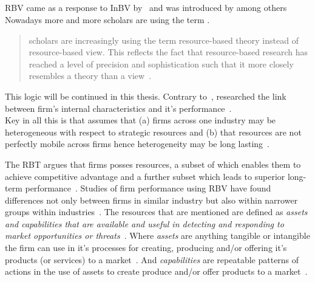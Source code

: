 \subsection{\rbt}\label{sec:Barney} %


\Gls{RBV} came as a response to \gls{InBV} by~\cite{Porter:1980to} and was introduced by among others~\cite{Barney:1991ur,Wernerfelt:1984hx}
Nowadays more and more scholars are using the term \rbt.
\begin{quote}
  scholars are increasingly using the term resource-based theory instead of
resource-based view.
This reflects the fact that resource-based research has reached a level of
precision and sophistication such that it more closely resembles a theory than a 
view~\cite{Barney:2011jp}.
\end{quote}
This logic will be continued in this thesis.
Contrary to~\cite{Porter:1980to}, \rbt researched the link between firm's internal characteristics and it's performance~\cite{Barney:1991ur}.\\
Key in all this is that \rbt assumes that (a) firms across one industry may be heterogeneous with respect to strategic resources and (b) that resources are not perfectly mobile across firms hence heterogeneity may be long lasting~\cite{Barney:1991ur}.

The \acrlong{RBT} argues that firms posses resources, a subset of which enables them to achieve competitive advantage and a further subset which leads to superior long-term performance~\cite{Barney:1991ur,Wernerfelt:1984hx,Grant:1991wg}.
Studies of firm performance using \acrfull{RBV} have found differences not only between firms in similar industry but also within narrower groups within 
industries~\cite{Hansen:1989um,Cool:1988vw}.
The resources that are mentioned are defined as \textit{assets and capabilities that are available and useful in detecting and responding to market opportunities or threats}~\cite{sanchez:1996,Wade:2004wf}.
Where \textit{assets} are anything tangible or intangible the firm can use in it's processes for creating, producing and/or offering it's products (or services) to a 
market~\cite{sanchez:1996}.
And \textit{capabilities} are repeatable patterns of actions in the use of assets to create produce and/or offer products to a market~\cite{sanchez:1996}.

